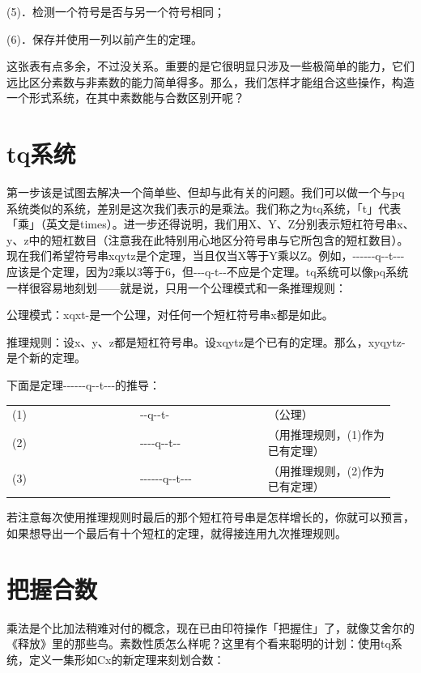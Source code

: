 \documentclass[
  12pt,
  twoside,
  openright,
  oldfontcommands,
]{memoir}
\begin{document}
(5)．检测一个符号是否与另一个符号相同；

(6)．保存并使用一列以前产生的定理。

这张表有点多余，不过没关系。重要的是它很明显只涉及一些极简单的能力，它们远比区分素数与非素数的能力简单得多。那么，我们怎样才能组合这些操作，构造一个形式系统，在其中素数能与合数区别开呢？

\section{tq系统}

第一步该是试图去解决一个简单些、但却与此有关的问题。我们可以做一个与pq系统类似的系统，差别是这次我们表示的是乘法。我们称之为tq系统，「t」代表「乘」（英文是times）。进一步还得说明，我们用X、Y、Z分别表示短杠符号串x、y、z中的短杠数目（注意我在此特别用心地区分符号串与它所包含的短杠数目）。现在我们希望符号串xqytz是个定理，当且仅当X等于Y乘以Z。例如，-\/-\/-\/-\/-\/-q-\/-t-\/-\/-应该是个定理，因为2乘以3等于6，但-\/-\/-q-t-\/-不应是个定理。tq系统可以像pq系统一样很容易地刻划------就是说，只用一个公理模式和一条推理规则：

公理模式：xqxt-是一个公理，对任何一个短杠符号串x都是如此。

推理规则：设x、y、z都是短杠符号串。设xqytz是个已有的定理。那么，xyqytz-是个新的定理。

下面是定理-\/-\/-\/-\/-\/-q-\/-t-\/-\/-的推导：

\begin{longtable}[]{>{\raggedright\arraybackslash}p{0.313\linewidth} >{\raggedright\arraybackslash}p{0.313\linewidth} >{\raggedright\arraybackslash}p{0.313\linewidth}}
\toprule\noalign{}
\endhead
\bottomrule\noalign{}
\endlastfoot
(1) & -\/-q-\/-t- & （公理） \\
(2) & -\/-\/-\/-q-\/-t-\/- & （用推理规则，(1)作为已有定理） \\
(3) & -\/-\/-\/-\/-\/-q-\/-t-\/-\/- & （用推理规则，(2)作为已有定理） \\
\end{longtable}

若注意每次使用推理规则时最后的那个短杠符号串是怎样增长的，你就可以预言，如果想导出一个最后有十个短杠的定理，就得接连用九次推理规则。

\section{把握合数}

乘法是个比加法稍难对付的概念，现在已由印符操作「把握住」了，就像艾舍尔的《释放》里的那些鸟。素数性质怎么样呢？这里有个看来聪明的计划：使用tq系统，定义一集形如Cx的新定理来刻划合数：
\end{document}
